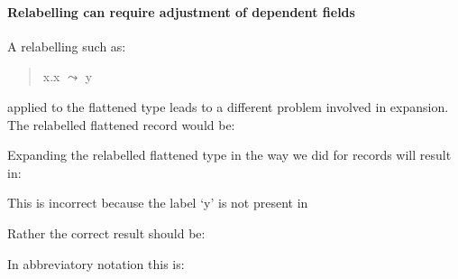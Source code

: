 \paragraph{Relabelling can require adjustment of dependent fields}
A relabelling such as:
\begin{quote}
x.x $\leadsto$ y
\end{quote}
applied to the flattened type leads to a different problem involved in
expansion.  
The relabelled flattened record would be:
\begin{quote}
\end{quote}
Expanding the relabelled flattened type in the way we did for records will result in:
\begin{quote}
\end{quote}
This is incorrect because the label `y' is not present in 
\begin{quote}
\end{quote}
Rather the correct result should be:
\begin{quote}
\end{quote}
In abbreviatory notation this is:
\begin{quote}
\end{quote}


